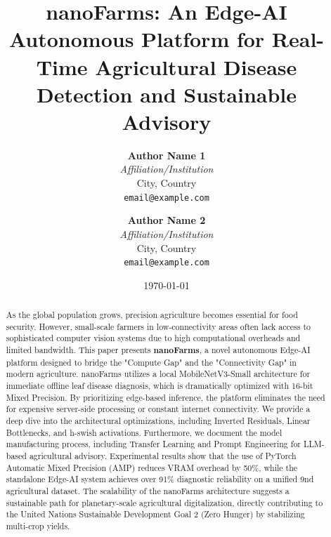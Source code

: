 \documentclass[11pt,onecolumn]{article}
\begin{document}
\title{\textbf{nanoFarms: An Edge-AI Autonomous Platform for Real-Time Agricultural Disease Detection and Sustainable Advisory}}

\author{
  \textbf{Author Name 1}\\
  \textit{Affiliation/Institution}\\
  City, Country\\
  \texttt{email@example.com}
  \and
  \textbf{Author Name 2}\\
  \textit{Affiliation/Institution}\\
  City, Country\\
  \texttt{email@example.com}
}

\date{\today}

\maketitle

\begin{abstract}
As the global population grows, precision agriculture becomes essential for food security. However, small-scale farmers in low-connectivity areas often lack access to sophisticated computer vision systems due to high computational overheads and limited bandwidth. This paper presents \textbf{nanoFarms}, a novel autonomous Edge-AI platform designed to bridge the "Compute Gap" and the "Connectivity Gap" in modern agriculture. nanoFarms utilizes a local MobileNetV3-Small architecture for immediate offline leaf disease diagnosis, which is dramatically optimized with 16-bit Mixed Precision. By prioritizing edge-based inference, the platform eliminates the need for expensive server-side processing or constant internet connectivity. We provide a deep dive into the architectural optimizations, including Inverted Residuals, Linear Bottlenecks, and h-swish activations. Furthermore, we document the model manufacturing process, including Transfer Learning and Prompt Engineering for LLM-based agricultural advisory. Experimental results show that the use of PyTorch Automatic Mixed Precision (AMP) reduces VRAM overhead by 50\%, while the standalone Edge-AI system achieves over 91\% diagnostic reliability on a unified 9nd agricultural dataset. The scalability of the nanoFarms architecture suggests a sustainable path for planetary-scale agricultural digitalization, directly contributing to the United Nations Sustainable Development Goal 2 (Zero Hunger) by stabilizing multi-crop yields.
\end{abstract}
\end{document}
